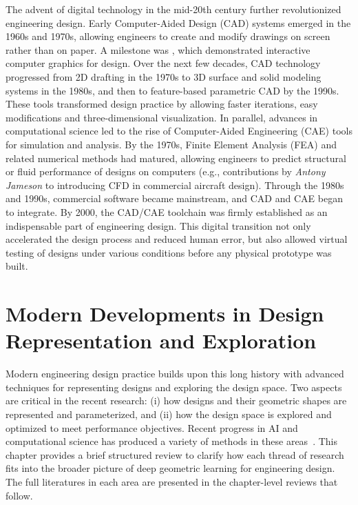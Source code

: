 The advent of digital technology in the mid-20th century further revolutionized engineering design. Early Computer-Aided Design (CAD) systems emerged in the 1960s and 1970s, allowing engineers to create and modify drawings on screen rather than on paper. A milestone was \citet{aa.Sutherland1963}, which demonstrated interactive computer graphics for design. Over the next few decades, CAD technology progressed from 2D drafting in the 1970s to 3D surface and solid modeling systems in the 1980s, and then to feature-based parametric CAD by the 1990s. These tools transformed design practice by allowing faster iterations, easy modifications and three-dimensional visualization. In parallel, advances in computational science led to the rise of Computer-Aided Engineering (CAE) tools for simulation and analysis. By the 1970s, Finite Element Analysis (FEA) and related numerical methods had matured, allowing engineers to predict structural or fluid performance of designs on computers (e.g., contributions by \textit{Antony Jameson} to introducing CFD in commercial aircraft design). Through the 1980s and 1990s, commercial software became mainstream, and CAD and CAE began to integrate. By 2000, the CAD/CAE toolchain was firmly established as an indispensable part of engineering design. This digital transition not only accelerated the design process and reduced human error, but also allowed virtual testing of designs under various conditions before any physical prototype was built.

\section{Modern Developments in Design Representation and Exploration}
\label{ch2:sec:literature_review}

Modern engineering design practice builds upon this long history with advanced techniques for representing designs and exploring the design space. Two aspects are critical in the recent research: (i) how designs and their geometric shapes are represented and parameterized, and (ii) how the design space is explored and optimized to meet performance objectives. Recent progress in AI and computational science has produced a variety of methods in these areas~\cite{aa.Martins2013,aa.Regenwetter2022}. This chapter provides a brief structured review to clarify how each thread of research fits into the broader picture of deep geometric learning for engineering design. The full literatures in each area are presented in the chapter-level reviews that follow.

